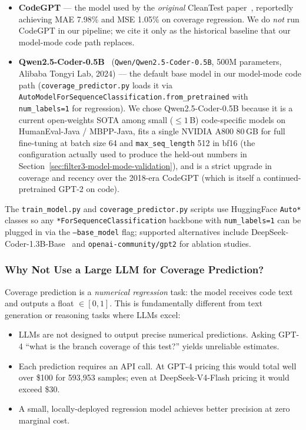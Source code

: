 \documentclass[acmlarge,nonacm,screen]{acmart}
\begin{document}
\begin{itemize}
    \item \textbf{CodeGPT} --- the model used by the \emph{original}
        CleanTest paper~\cite{zhang2025cleantest}, reportedly
        achieving MAE 7.98\% and MSE 1.05\% on coverage regression.
        We do \emph{not} run CodeGPT in our pipeline; we cite it
        only as the historical baseline that our model-mode code
        path replaces.
    \item \textbf{Qwen2.5-Coder-0.5B}~\cite{hui2024qwen}
        (\texttt{Qwen/Qwen2.5-Coder-0.5B}, 500M parameters,
        Alibaba Tongyi Lab, 2024) --- the default base model in
        our model-mode code path
        (\texttt{coverage\_predictor.py} loads it via
        \texttt{AutoModelForSequenceClassification.\allowbreak from\_pretrained}
        with \texttt{num\_labels=1} for regression). We chose
        Qwen2.5-Coder-0.5B because it is a current open-weights
        SOTA among small ($\leq 1$\,B) code-specific models on
        HumanEval-Java / MBPP-Java, fits a single NVIDIA A800
        80\,GB for full fine-tuning at batch size 64 and
        \texttt{max\_seq\_length} 512 in bf16 (the configuration
        actually used to produce the held-out numbers in
        Section~\ref{sec:filter3-model-mode-validation}), and is a
        strict upgrade in coverage and recency over the 2018-era
        CodeGPT (which is itself a continued-pretrained GPT-2 on
        code).
\end{itemize}

The \texttt{train\_model.py} and \texttt{coverage\_predictor.py}
scripts use HuggingFace \texttt{Auto*} classes so any
\texttt{*ForSequenceClassification} backbone with
\texttt{num\_labels=1} can be plugged in via the
\texttt{--base\_model} flag; supported alternatives include
DeepSeek-Coder-1.3B-Base~\cite{guo2024deepseek} and
\texttt{openai-community/gpt2} for ablation studies.

\subsubsection{Why Not Use a Large LLM for Coverage Prediction?}

Coverage prediction is a \textit{numerical regression} task: the model receives code text and outputs a float $\in [0, 1]$. This is fundamentally different from text generation or reasoning tasks where LLMs excel:

\begin{itemize}
    \item LLMs are not designed to output precise numerical predictions. Asking GPT-4 ``what is the branch coverage of this test?'' yields unreliable estimates.
    \item Each prediction requires an API call. At GPT-4 pricing this would total well over \$100 for 593,953 samples; even at DeepSeek-V4-Flash pricing it would exceed \$30.
    \item A small, locally-deployed regression model achieves better precision at zero marginal cost.
\end{itemize}
\end{document}
